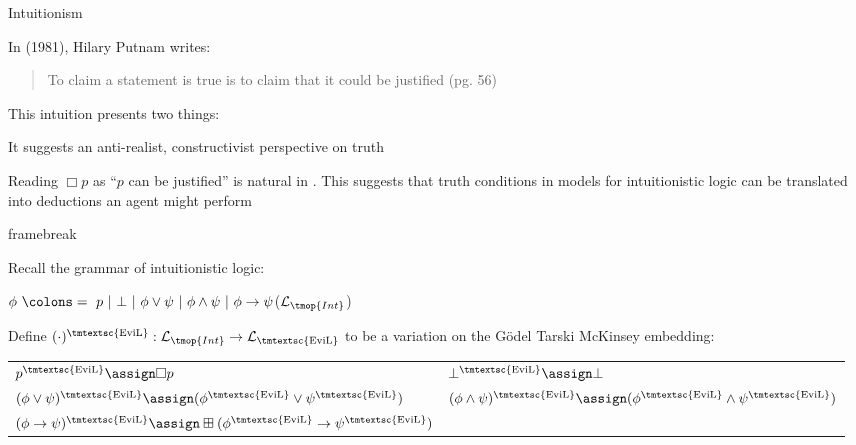 Intuitionism

In  (1981), Hilary Putnam writes:

\begin{quote}
  To claim a statement is true is to claim that it could be justified (pg. 56)
\end{quote}

This intuition presents two things:
\begin{enumeratenumeric}
  \item It suggests an anti-realist, constructivist perspective on truth
  
  \item Reading $\Box  p$ as ``$p$ can be justified'' is natural in
  . This suggests that truth conditions in models for
  intuitionistic logic can be translated into deductions an 
  agent might perform
\end{enumeratenumeric}
framebreak

Recall the grammar of intuitionistic logic:

{\hspace*{\fill}}$\phi \text{ } \colons = \text{ } p \text{ } | \text{ } \bot
\text{ } | \text{ } \phi \vee \psi \text{ } | \text{ } \phi \wedge \psi \text{
} | \text{ } \phi \rightarrow
\psi${\hspace*{\fill}}($\mathcal{L}_{\tmop{Int}}$)



Define $(\cdot)^{\text{\tmtextsc{EviL}}} : \text{$\mathcal{L}_{\tmop{Int}}$}
\rightarrow \mathcal{L}_{\text{\tmtextsc{EviL}}}$ to be a variation on the
G\"{o}del Tarski McKinsey embedding:

\begin{center}
  \begin{tabular}{ll}
    $p^{\text{\tmtextsc{EviL}}} \assign \Box p$ &
    $\bot^{\text{\tmtextsc{EviL}}} \assign \bot$\\
    $(\phi \vee \psi)^{\text{\tmtextsc{EviL}}} \assign
    (\phi^{\text{\tmtextsc{EviL}}} \vee \psi^{\text{\tmtextsc{EviL}}})^{}$ &
    $(\phi \wedge \psi)^{\text{\tmtextsc{EviL}}} \assign
    (\phi^{\text{\tmtextsc{EviL}}} \wedge \psi^{\text{\tmtextsc{EviL}}})^{}$\\
    $(\phi \rightarrow \psi)^{\text{\tmtextsc{EviL}}} \assign \boxplus
    (\phi^{\text{\tmtextsc{EviL}}} \rightarrow \psi^{\text{\tmtextsc{EviL}}})$
    & 
  \end{tabular}
\end{center}

